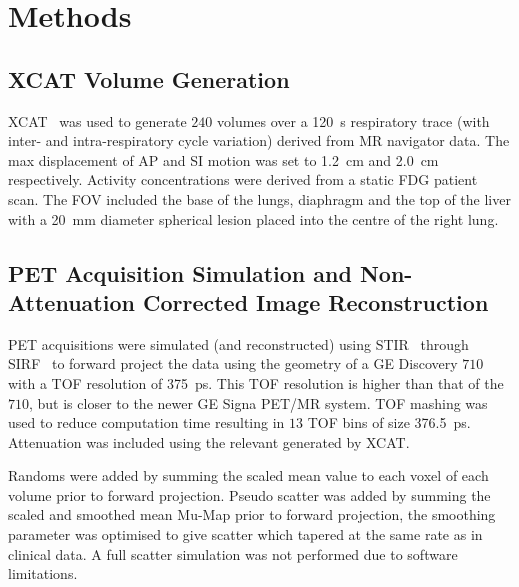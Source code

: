 \vspace{-0.4cm}

\section{Methods} \label{sec:methods}
    \vspace{-0.25cm}
    
    \subsection{XCAT Volume Generation} \label{sec:xcat_volume_generation}
        \gls{XCAT}~\cite{Segars2010} was used to generate $240$ volumes over a \SI{120}{\second} respiratory trace (with inter- and intra-respiratory cycle variation) derived from \gls{MR} navigator data. The max displacement of \gls{AP} and \gls{SI} motion was set to \SI{1.2}{\centi\metre} and \SI{2.0}{\centi\metre} respectively. Activity concentrations were derived from a static \gls{FDG} patient scan. The \gls{FOV} included the base of the lungs, diaphragm and the top of the liver with a \SI{20}{\milli\metre} diameter spherical lesion placed into the centre of the right lung.
    
    \vspace{-0.4cm}
    
    \subsection{PET Acquisition Simulation and Non-Attenuation Corrected Image Reconstruction} \label{sec:pet_acquisition_simulation_and_non_attenuation_corrected_image_reconstruction}
        \gls{PET} acquisitions were simulated (and reconstructed) using \gls{STIR}~\cite{Thielemans2012, Nikos2019} through \gls{SIRF}~\cite{Ovtchinnikov2017} to forward project the data using the geometry of a \gls{GE} Discovery $710$ with a \gls{TOF} resolution of \SI{375}{\pico\second}. This \gls{TOF} resolution is higher than that of the $710$, but is closer to the newer \gls{GE} Signa \gls{PET}/\gls{MR} system. \gls{TOF} mashing was used to reduce computation time resulting in $13$ \gls{TOF} bins of size \SI{376.5}{\pico\second}. Attenuation was included using the relevant  generated by \gls{XCAT}.
        
        Randoms were added by summing the scaled mean value to each voxel of each volume prior to forward projection. Pseudo scatter was added by summing the scaled and smoothed mean \gls{Mu-Map} prior to forward projection, the smoothing parameter was optimised to give scatter which tapered at the same rate as in clinical data. A full scatter simulation was not performed due to software limitations.
        
